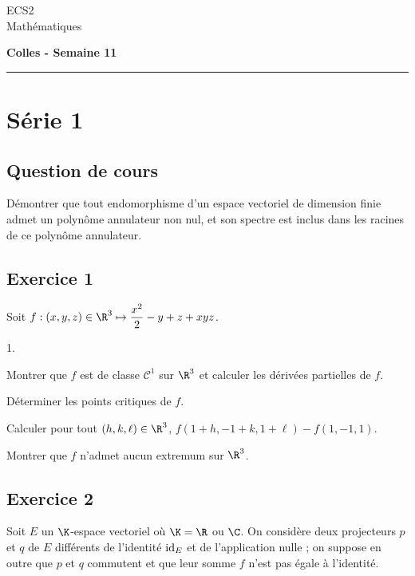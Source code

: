 \documentclass[11pt]{article}%
\begin{document}
\begin{flushleft}
ECS2 \\
Mathématiques
\end{flushleft}

\begin{center}
\textbf{\Large{Colles - Semaine 11}}
\end{center}

\hrule

\vspace*{0,2cm}

\section*{Série 1}
\subsection*{Question de cours}
\noindent
Démontrer que tout endomorphisme d'un espace vectoriel de dimension 
finie admet un polynôme annulateur non nul, et son spectre est inclus 
dans les racines de ce polynôme annulateur.

\subsection*{Exercice 1} %
\noindent
Soit $f:(x,y,z)\in\R^3\mapsto \dfrac{x^2}{2}-y+z+xyz$.
\begin{noliste}{1.}
\item
Montrer que $f$ est de classe $\mathcal C^1$ sur $\R^3$ et calculer les 
dérivées partielles de $f$.
\item
Déterminer les points critiques de $f$.
\item
Calculer pour tout $(h,k,\ell)\in\R^3$, $f(1+h,-1+k,1+\ell)-f(1,-1,1)$.
\item
Montrer que $f$ n'admet aucun extremum sur $\R^3$.
\end{noliste}


\subsection*{Exercice 2} %
\noindent
Soit $E$ un $\K$-espace vectoriel où $\K=\R$ ou $\C$. On
considère deux projecteurs $p$ et $q$ de $E$ différents de
l'identité ${\rm{id}}_E$ et de l'application nulle ; on suppose en outre
que $p$ et $q$ commutent et que leur somme $f$ n'est pas égale
à l'identité.
\end{document}
